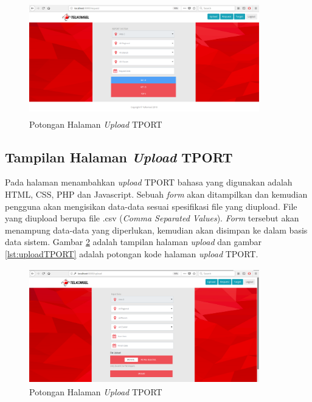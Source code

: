 \begin{figure}[h!]
	\centerline
	{\includegraphics[width=10cm,height=5cm]{bab5/tampilanRequest.png}}
	\caption{Potongan Halaman \textit{Upload} TPORT}
	\label{figure:requestTPORT}
\end{figure}



\subsection{Tampilan Halaman \textit{Upload} TPORT}
Pada halaman menambahkan \textit{upload} TPORT bahasa yang digunakan adalah HTML, CSS, PHP dan Javascript. Sebuah \textit{form} akan ditampilkan dan kemudian pengguna akan mengisikan data-data sesuai spesifikasi file yang diupload. File yang diupload berupa file .csv (\textit{Comma Separated Values}). \textit{Form} tersebut akan menampung data-data yang diperlukan, kemudian akan disimpan ke dalam basis data sistem. Gambar \ref{figure:uploadTPORT} adalah tampilan halaman \textit{upload} dan gambar \ref{lst:uploadTPORT} adalah potongan kode halaman \textit{upload} TPORT.

\begin{figure}[h!]
\centerline
{\includegraphics[width=10cm,height=5cm]{bab5/tampilanUpload.png}}
\caption{Potongan Halaman \textit{Upload} TPORT}
\label{figure:uploadTPORT}
\end{figure}

